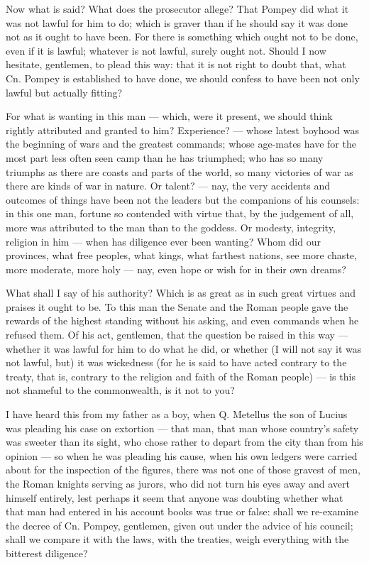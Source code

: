  Now what is said? What does the prosecutor allege? That Pompey did what it was not lawful for him to do; which is graver than if he should say it was done not as it ought to have been. For there is something which ought not to be done, even if it is lawful; whatever is not lawful, surely ought not. Should I now hesitate, gentlemen, to plead this way: that it is not right to doubt that, what Cn. Pompey is established to have done, we should confess to have been not only lawful but actually fitting?

 For what is wanting in this man --- which, were it present, we should think rightly attributed and granted to him? Experience? --- whose latest boyhood was the beginning of wars and the greatest commands; whose age-mates have for the most part less often seen camp than he has triumphed; who has so many triumphs as there are coasts and parts of the world, so many victories of war as there are kinds of war in nature. Or talent? --- nay, the very accidents and outcomes of things have been not the leaders but the companions of his counsels: in this one man, fortune so contended with virtue that, by the judgement of all, more was attributed to the man than to the goddess. Or modesty, integrity, religion in him --- when has diligence ever been wanting? Whom did our provinces, what free peoples, what kings, what farthest nations, see more chaste, more moderate, more holy --- nay, even hope or wish for in their own dreams?

 What shall I say of his authority? Which is as great as in such great virtues and praises it ought to be. To this man the Senate and the Roman people gave the rewards of the highest standing without his asking, and even commands when he refused them. Of his act, gentlemen, that the question be raised in this way --- whether it was lawful for him to do what he did, or whether (I will not say it was not lawful, but) it was wickedness (for he is said to have acted contrary to the treaty, that is, contrary to the religion and faith of the Roman people) --- is this not shameful to the commonwealth, is it not to you?

 I have heard this from my father as a boy, when Q. Metellus the son of Lucius was pleading his case on extortion --- that man, that man whose country's safety was sweeter than its sight, who chose rather to depart from the city than from his opinion --- so when he was pleading his cause, when his own ledgers were carried about for the inspection of the figures, there was not one of those gravest of men, the Roman knights serving as jurors, who did not turn his eyes away and avert himself entirely, lest perhaps it seem that anyone was doubting whether what that man had entered in his account books was true or false: shall we re-examine the decree of Cn. Pompey, gentlemen, given out under the advice of his council; shall we compare it with the laws, with the treaties, weigh everything with the bitterest diligence?

